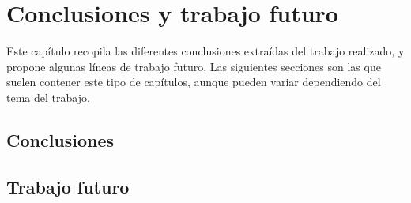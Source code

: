 
\chapter{Conclusiones y trabajo futuro}
\label{ch:Conclusiones y trabajo futuro}

\noindent Este capítulo recopila las diferentes conclusiones extraídas del trabajo realizado, y propone algunas líneas de trabajo futuro. Las siguientes secciones son las que suelen contener este tipo de capítulos, aunque pueden variar dependiendo del tema del trabajo.

\section{Conclusiones}
\label{sec:Conclu}


\section{Trabajo futuro}
\label{sec:Trab_Fut}